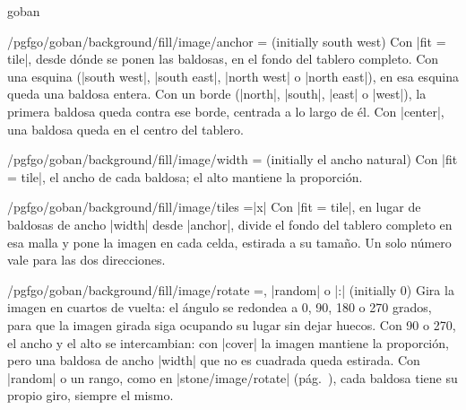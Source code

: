\begin{environment}{{goban}}
	\begin{key}{/pgfgo/goban/background/fill/image/anchor = (initially south west)}
		Con |fit = tile|, desde dónde se ponen las baldosas, en el fondo del tablero completo. Con una esquina (|south west|, |south east|, |north west| o |north east|), en esa esquina queda una baldosa entera. Con un borde (|north|, |south|, |east| o |west|), la primera baldosa queda contra ese borde, centrada a lo largo de él. Con |center|, una baldosa queda en el centro del tablero.

		\begin{codeexample}[]
			\begin{goban}[5, background = {fill = {image = {
				file = pgfgo-tile.png, fit = tile, width = 1cm, anchor = north east}}}]
			\end{goban}

			\begin{goban}[5, background = {fill = {image = {
				file = pgfgo-tile.png, fit = tile, width = 1cm, anchor = north}}}]
			\end{goban}
		\end{codeexample}
	\end{key}

	\begin{key}{/pgfgo/goban/background/fill/image/width = (initially el ancho natural)}
		Con |fit = tile|, el ancho de cada baldosa; el alto mantiene la proporción.
	\end{key}

	\begin{key}{/pgfgo/goban/background/fill/image/tiles =|x|}
		Con |fit = tile|, en lugar de baldosas de ancho |width| desde |anchor|, divide el fondo del tablero completo en esa malla y pone la imagen en cada celda, estirada a su tamaño. Un solo número vale para las dos direcciones.

		\begin{codeexample}[]
			\begin{goban}[9, background = {fill = {image = {
				file = pgfgo-cell.png, fit = tile, tiles = 3x3}}}]
			\end{goban}
		\end{codeexample}
	\end{key}

	\begin{key}{/pgfgo/goban/background/fill/image/rotate =, |random| o |:| (initially 0)}
		Gira la imagen en cuartos de vuelta: el ángulo se redondea a 0, 90, 180 o 270 grados, para que la imagen girada siga ocupando su lugar sin dejar huecos. Con 90 o 270, el ancho y el alto se intercambian: con |cover| la imagen mantiene la proporción, pero una baldosa de ancho |width| que no es cuadrada queda estirada. Con |random| o un rango, como en |stone/image/rotate| (pág.~\pageref{subsec:piedrasimagen}), cada baldosa tiene su propio giro, siempre el mismo.


\end{key}
\end{environment}
